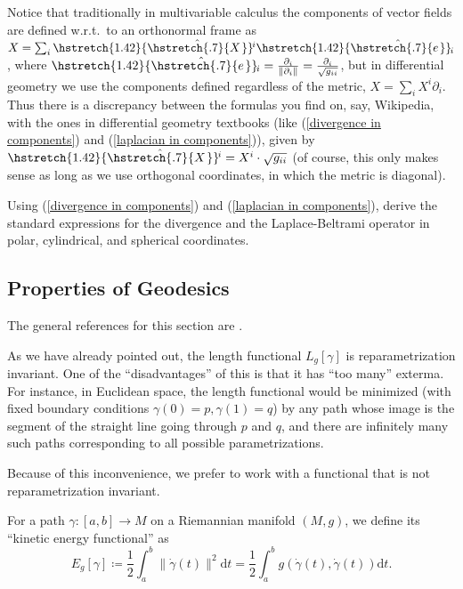 \documentclass[english,letterpaper]{article}%
\numberwithin{equation}{section}
\numberwithin{figure}{section}
\numberwithin{table}{section}
\theoremstyle{definition}
\theoremstyle{definition}
\theoremstyle{definition}
\theoremstyle{plain}
\theoremstyle{plain}
\theoremstyle{plain}
\theoremstyle{plain}
\theoremstyle{remark}
\theoremstyle{remark}
\newcommand{\dd}{{\mathrm{d}}}
\newcommand\wh[1]{\hstretch{1.42}{\hat{\hstretch{.7}{#1\mkern2mu}}}\mkern-2mu} %
\begin{document}
\begin{rem}
    Notice that traditionally in multivariable calculus the components of vector fields are defined w.r.t.\ to an orthonormal frame as $X=\sum_i \wh{X}^i \wh{e}_i$, where $\wh{e}_i=\frac{\partial_i}{\lVert \partial_i\lVert}=\frac{\partial_i}{\sqrt{g_{ii}}}$, but in differential geometry we use the components defined regardless of the metric, $X=\sum_i X^i \partial_i$. Thus there is a discrepancy between the formulas you find on, say, Wikipedia, with the ones in differential geometry textbooks (like (\ref{divergence in components}) and (\ref{laplacian in components})), given by $\wh{X}^i=X^i\cdot \sqrt{g_{ii}}$ (of course, this only makes sense as long as we use orthogonal coordinates, in which the metric is diagonal).
\end{rem}

\begin{xca}
    Using (\ref{divergence in components}) and (\ref{laplacian in components}), derive the standard expressions for the divergence and the Laplace-Beltrami operator in polar, cylindrical, and spherical  coordinates. 
\end{xca}




\subsection{Properties of Geodesics}


The general references for this section are \cite{Jost,Milnor}.

As we have already pointed out, the length functional $L_g[\gamma]$ is reparametrization invariant. One of the ``disadvantages'' of this is that it has ``too many'' exterma. For instance, in Euclidean space, the length functional would be minimized (with fixed boundary conditions $\gamma(0)=p,\gamma(1)=q$) by any path whose image is the segment of the straight line going through $p$ and $q$, and there are infinitely many such paths corresponding to all possible parametrizations.

Because of this inconvenience, we prefer to work with a functional that is not reparametrization invariant.

\begin{defn}
    For a path $\gamma:[a,b]\to M$ on a Riemannian manifold $(M,g)$, we define its ``kinetic energy functional'' as
    \[E_g[\gamma]\coloneqq \frac12 \int_a^b \lVert \dot\gamma(t)\rVert^2\dd t=\frac12 \int_a^b g(\dot\gamma(t),\dot\gamma(t))\dd t.\]
\end{defn}
\end{document}
